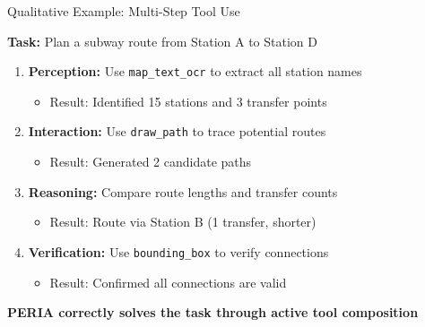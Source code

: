 \documentclass[aspectratio=169,xcolor=dvipsnames]{beamer}
\begin{document}
\begin{frame}{Qualitative Example: Multi-Step Tool Use}
\begin{center}
\textbf{Task:} Plan a subway route from Station A to Station D
\end{center}

\vspace{0.5em}

\begin{enumerate}
    \item \textbf{Perception:} Use \texttt{map\_text\_ocr} to extract all station names
    \begin{itemize}
        \item Result: Identified 15 stations and 3 transfer points
    \end{itemize}

    \item \textbf{Interaction:} Use \texttt{draw\_path} to trace potential routes
    \begin{itemize}
        \item Result: Generated 2 candidate paths
    \end{itemize}

    \item \textbf{Reasoning:} Compare route lengths and transfer counts
    \begin{itemize}
        \item Result: Route via Station B (1 transfer, shorter)
    \end{itemize}

    \item \textbf{Verification:} Use \texttt{bounding\_box} to verify connections
    \begin{itemize}
        \item Result: Confirmed all connections are valid
    \end{itemize}
\end{enumerate}

\vspace{0.5em}
\centering
\colorbox{green!20}{\parbox{0.85\textwidth}{\centering
\textbf{PERIA correctly solves the task through active tool composition}
}}
\end{frame}
\end{document}
